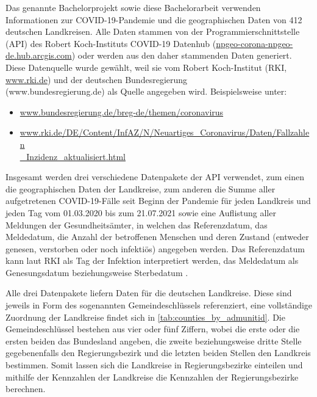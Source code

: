 Das genannte Bachelorprojekt sowie diese Bachelorarbeit verwenden Informationen zur COVID-19-Pandemie und die geographischen Daten von 412 deutschen Landkreisen. Alle Daten stammen von der Programmierschnittstelle (API) des Robert Koch-Instituts \glqq{}COVID-19 Datenhub\grqq{}
(\href{npgeo-corona-npgeo-de.hub.arcgis.com}{npgeo-corona-npgeo-de.hub.arcgis.com}) oder werden aus den daher stammenden Daten generiert. Diese Datenquelle wurde gewählt, weil sie vom Robert Koch-Institut (RKI, \href{www.rki.de}{www.rki.de}) und der deutschen Bundesregierung\\
 (www.bundesregierung.de) als Quelle angegeben wird. Beispielsweise unter:
\begin{itemize}
    \item \href{www.bundesregierung.de/breg-de/themen/coronavirus}{www.bundesregierung.de/breg-de/themen/coronavirus}
    \item \href{www.rki.de/DE/Content/InfAZ/N/Neuartiges_Coronavirus/Daten/Fallzahlen_Inzidenz_aktualisiert.html}{www.rki.de/DE/Content/InfAZ/N/Neuartiges\_Coronavirus/Daten/Fallzahlen}\\
    \href{www.rki.de/DE/Content/InfAZ/N/Neuartiges_Coronavirus/Daten/Fallzahlen_Inzidenz_aktualisiert.html}{\_Inzidenz\_aktualisiert.html}
\end{itemize}

Insgesamt werden drei verschiedene Datenpakete der API verwendet, zum einen die geographischen Daten der Landkreise, zum anderen die Summe aller aufgetretenen COVID-19-Fälle seit Beginn der Pandemie für jeden Landkreis und jeden Tag vom 01.03.2020 bis zum 21.07.2021 sowie eine Auflistung aller Meldungen der Gesundheitsämter, in welchen das  Referenzdatum, das Meldedatum, die Anzahl der betroffenen Menschen und deren Zustand (entweder genesen, verstorben oder noch infektiös) angegeben werden. Das Referenzdatum kann laut RKI als Tag der Infektion interpretiert werden, das Meldedatum als Genesungsdatum beziehungsweise Sterbedatum \autocite{RKI_Bulletin}.

Alle drei Datenpakete liefern Daten für die deutschen Landkreise. Diese sind jeweils in Form des sogenannten Gemeindeschlüssels referenziert, eine vollständige Zuordnung der Landkreise findet sich in \autoref{tab:counties_by_admunitid}. Die Gemeindeschlüssel bestehen aus vier oder fünf Ziffern, wobei die erste oder die ersten beiden das Bundesland angeben, die zweite beziehungsweise dritte Stelle gegebenenfalls den Regierungsbezirk und die letzten beiden Stellen den Landkreis bestimmen. Somit lassen sich die Landkreise in Regierungsbezirke einteilen und mithilfe der Kennzahlen der Landkreise die Kennzahlen der Regierungsbezirke berechnen.

